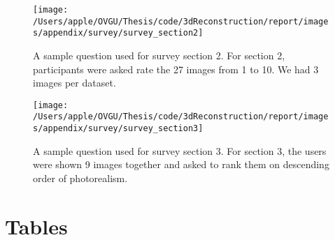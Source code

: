 \begin{figure}
    \centering
    \texttt{[image: /Users/apple/OVGU/Thesis/code/3dReconstruction/report/images/appendix/survey/survey\_section2]}
    \caption{A sample question used for survey section 2. For section 2, participants were asked rate the 27 images from 1 to 10. We had 3 images per dataset.}
    \label{fig:survey_sample_section2}
\end{figure}

\begin{figure}
    \centering
    \texttt{[image: /Users/apple/OVGU/Thesis/code/3dReconstruction/report/images/appendix/survey/survey\_section3]}
    \caption{A sample question used for survey section 3. For section 3, the users were shown 9 images together and asked to rank them on descending order of photorealism. }
    \label{fig:survey_sample_section3}
\end{figure}

\section{Tables}

\begin{table}[ht]
    \centering
    \caption{Table represents \gls{iou} values for each category when trained on Pix2Vox++.
    The models trained on synthetic data is significantly bad when tested on real-data.}
    \label{tab:baseline_categories_all_iou_pix2voxpp}
\end{table}



